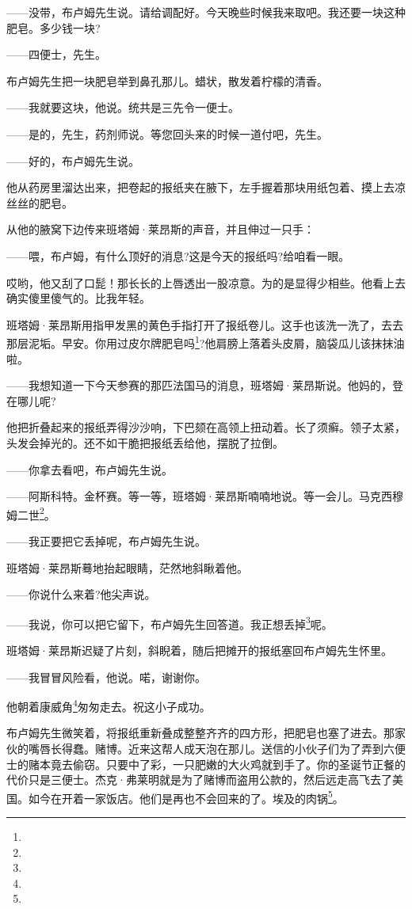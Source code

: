 \par ——没带，布卢姆先生说。请给调配好。今天晚些时候我来取吧。我还要一块这种肥皂。多少钱一块?
\par ——四便士，先生。
\par 布卢姆先生把一块肥皂举到鼻孔那儿。蜡状，散发着柠檬的清香。
\par ——我就要这块，他说。统共是三先令一便士。
\par ——是的，先生，药剂师说。等您回头来的时候一道付吧，先生。
\par ——好的，布卢姆先生说。
\par 他从药房里溜达出来，把卷起的报纸夹在腋下，左手握着那块用纸包着、摸上去凉丝丝的肥皂。
\par 从他的腋窝下边传来班塔姆·莱昂斯的声音，并且伸过一只手：
\par ——喂，布卢姆，有什么顶好的消息?这是今天的报纸吗?给咱看一眼。
\par 哎哟，他又刮了口髭！那长长的上唇透出一股凉意。为的是显得少相些。他看上去确实傻里傻气的。比我年轻。
\par 班塔姆·莱昂斯用指甲发黑的黄色手指打开了报纸卷儿。这手也该洗一洗了，去去那层泥垢。早安。你用过皮尔牌肥皂吗\footnote{}?他肩膀上落着头皮屑，脑袋瓜儿该抹抹油啦。
\par ——我想知道一下今天参赛的那匹法国马的消息，班塔姆·莱昂斯说。他妈的，登在哪儿呢?
\par 他把折叠起来的报纸弄得沙沙响，下巴颏在高领上扭动着。长了须癣。领子太紧，头发会掉光的。还不如干脆把报纸丢给他，摆脱了拉倒。
\par ——你拿去看吧，布卢姆先生说。
\par ——阿斯科特。金杯赛。等一等，班塔姆·莱昂斯喃喃地说。等一会儿。马克西穆姆二世\footnote{}。
\par ——我正要把它丢掉呢，布卢姆先生说。
\par 班塔姆·莱昂斯蓦地抬起眼睛，茫然地斜瞅着他。
\par ——你说什么来着?他尖声说。
\par ——我说，你可以把它留下，布卢姆先生回答道。我正想丢掉\footnote{}呢。
\par 班塔姆·莱昂斯迟疑了片刻，斜睨着，随后把摊开的报纸塞回布卢姆先生怀里。
\par ——我冒冒风险看，他说。喏，谢谢你。
\par 他朝着康威角\footnote{}匆匆走去。祝这小子成功。
\par 布卢姆先生微笑着，将报纸重新叠成整整齐齐的四方形，把肥皂也塞了进去。那家伙的嘴唇长得蠢。赌博。近来这帮人成天泡在那儿。送信的小伙子们为了弄到六便士的赌本竟去偷窃。只要中了彩，一只肥嫩的大火鸡就到手了。你的圣诞节正餐的代价只是三便士。杰克·弗莱明就是为了赌博而盗用公款的，然后远走高飞去了美国。如今在开着一家饭店。他们是再也不会回来的了。埃及的肉锅\footnote{}。
